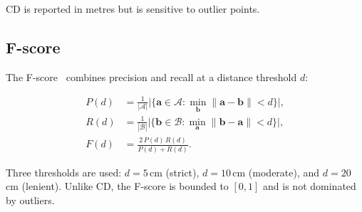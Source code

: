 \noindent CD is reported in metres but is sensitive to outlier points.

\subsection{F-score}

The F-score~\cite{knapitsch2017tanks} combines precision and recall at a
distance threshold $d$:

\begin{align}
  P(d) &= \frac{1}{|\mathcal{A}|}
          \bigl|\{\mathbf{a}\in\mathcal{A} :
          \min_{\mathbf{b}}\lVert\mathbf{a}-\mathbf{b}\rVert < d\}\bigr|, \\[4pt]
  R(d) &= \frac{1}{|\mathcal{B}|}
          \bigl|\{\mathbf{b}\in\mathcal{B} :
          \min_{\mathbf{a}}\lVert\mathbf{b}-\mathbf{a}\rVert < d\}\bigr|, \\[4pt]
  F(d) &= \frac{2\,P(d)\,R(d)}{P(d)+R(d)}.
  \label{eq:fscore}
\end{align}

Three thresholds are used: $d = 5$\,cm (strict), $d = 10$\,cm (moderate), and
$d = 20$\,cm (lenient). Unlike CD, the F-score is bounded to $[0,1]$ and is not
dominated by outliers.
